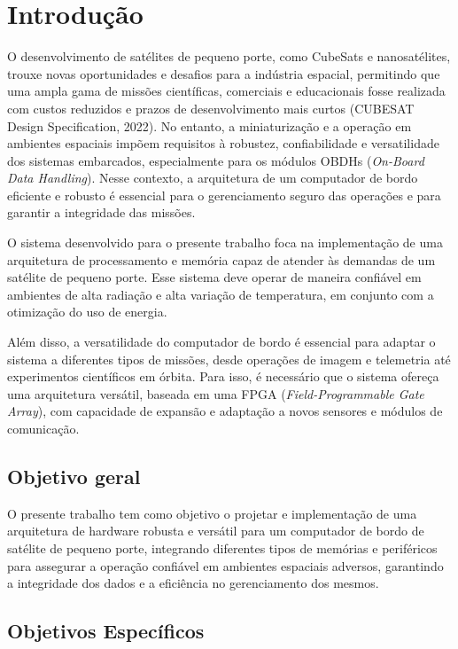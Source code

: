 \chapter{Introdução}
\label{Chap:intro}

O desenvolvimento de satélites de pequeno porte, como CubeSats e nanosatélites, trouxe novas oportunidades e desafios para a indústria espacial, permitindo que uma ampla gama de missões científicas, comerciais e educacionais fosse realizada com custos reduzidos e prazos de desenvolvimento mais curtos (CUBESAT Design Specification, 2022). No entanto, a miniaturização e a operação em ambientes espaciais impõem requisitos à robustez, confiabilidade e versatilidade dos sistemas embarcados, especialmente para os módulos OBDHs (\textit{On-Board Data Handling}). Nesse contexto, a arquitetura de um computador de bordo eficiente e robusto é essencial para o gerenciamento seguro das operações e para garantir a integridade das missões.

O sistema desenvolvido para o presente trabalho foca na implementação de uma arquitetura de processamento e memória capaz de atender às demandas de um satélite de pequeno porte. Esse sistema deve operar de maneira confiável em ambientes de alta radiação e alta variação de temperatura, em conjunto com a otimização do uso de energia.

Além disso, a versatilidade do computador de bordo é essencial para adaptar o sistema a diferentes tipos de missões, desde operações de imagem e telemetria até experimentos científicos em órbita. Para isso, é necessário que o sistema ofereça uma arquitetura versátil, baseada em uma FPGA (\textit{Field-Programmable Gate Array}), com capacidade de expansão e adaptação a novos sensores e módulos de comunicação.

\section{Objetivo geral}

O presente trabalho tem como objetivo o projetar e implementação de uma arquitetura de hardware robusta e versátil para um computador de bordo de satélite de pequeno porte, integrando diferentes tipos de memórias e periféricos para assegurar a operação confiável em ambientes espaciais adversos, garantindo a integridade dos dados e a eficiência no gerenciamento dos mesmos.

\section{Objetivos Específicos}

